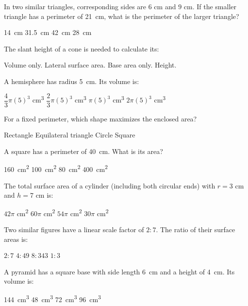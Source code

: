 \documentclass[addpoints]{exam}
\begin{document}
\begin{questions}
\question[1]
In two similar triangles, corresponding sides are $6$ cm and $9$ cm. If the smaller triangle has a perimeter of \SI{21}{cm}, what is the perimeter of the larger triangle?
\begin{choices}
    \choice \SI{14}{cm}
    \correctchoice \SI{31.5}{cm}
    \choice \SI{42}{cm}
    \choice \SI{28}{cm}
\end{choices}

\question[1]
The slant height of a cone is needed to calculate its:
\begin{choices}
    \choice Volume only.
    \correctchoice Lateral surface area.
    \choice Base area only.
    \choice Height.
\end{choices}

\question[1]
A hemisphere has radius \SI{5}{cm}. Its volume is:
\begin{choices}
    \choice $\dfrac{4}{3}\pi(5)^3$ \si{cm^3}
    \correctchoice $\dfrac{2}{3}\pi(5)^3$ \si{cm^3}
    \choice $\pi(5)^3$ \si{cm^3}
    \choice $2\pi(5)^3$ \si{cm^3}
\end{choices}

\question[1]
For a fixed perimeter, which shape maximizes the enclosed area?
\begin{choices}
    \choice Rectangle
    \choice Equilateral triangle
    \correctchoice Circle
    \choice Square
\end{choices}

\question[1]
A square has a perimeter of \SI{40}{cm}. What is its area?
\begin{choices}
    \choice \SI{160}{cm^2}
    \correctchoice \SI{100}{cm^2}
    \choice \SI{80}{cm^2}
    \choice \SI{400}{cm^2}
\end{choices}

\question[1]
The total surface area of a cylinder (including both circular ends) with $r = 3$ cm and $h = 7$ cm is:
\begin{choices}
    \choice $42\pi$ \si{cm^2}
    \correctchoice $60\pi$ \si{cm^2}
    \choice $54\pi$ \si{cm^2}
    \choice $30\pi$ \si{cm^2}
\end{choices}

\question[1]
Two similar figures have a linear scale factor of $2:7$. The ratio of their surface areas is:
\begin{choices}
    \choice $2:7$
    \correctchoice $4:49$
    \choice $8:343$
    \choice $1:3$
\end{choices}

\question[1]
A pyramid has a square base with side length \SI{6}{cm} and a height of \SI{4}{cm}. Its volume is:
\begin{choices}
    \choice \SI{144}{cm^3}
    \correctchoice \SI{48}{cm^3}
    \choice \SI{72}{cm^3}
    \choice \SI{96}{cm^3}
\end{choices}


\end{questions}
\end{document}
